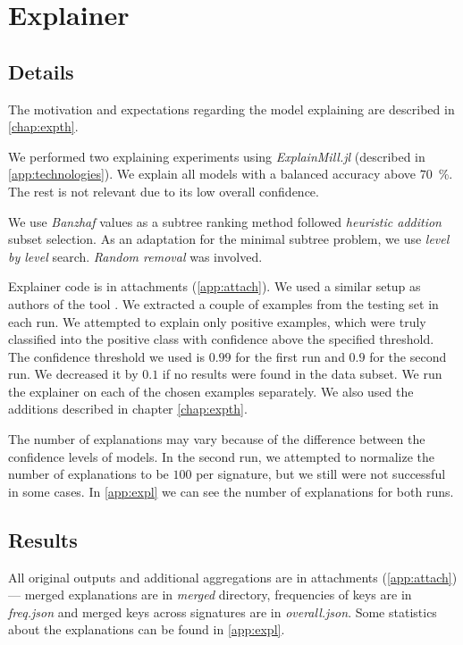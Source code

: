 \section{Explainer}
\subsection{Details}
The motivation and expectations regarding the model explaining are described in \ref{chap:expth}.

We performed two explaining experiments using \emph{ExplainMill.jl} (described in \ref{app:technologies}). We explain all models with a balanced accuracy above $70$~\%.  The rest is not relevant due to its low overall confidence.

We use \emph{Banzhaf} values as a subtree ranking method followed \emph{heuristic addition} subset selection. As an adaptation for the minimal subtree problem, we use \emph{level by level} search. \emph{Random removal} was involved.

Explainer code is in attachments (\ref{app:attach}). We used a similar setup as authors of the tool \cite{Pevny2020}. We extracted a couple of examples from the testing set in each run. We attempted to explain only positive examples, which were truly classified into the positive class with confidence above the specified threshold. The confidence threshold we used is $0.99$ for the first run and $0.9$ for the second run. We decreased it by $0.1$ if no results were found in the data subset. We run the explainer on each of the chosen examples separately. We also used the additions described in chapter \ref{chap:expth}.

The number of explanations may vary because of the difference between the confidence levels of models. In the second run, we attempted to normalize the number of explanations to be $100$ per signature, but we still were not successful in some cases.  In \ref{app:expl} we can see the number of explanations for both runs.

\subsection{Results}
All original outputs and additional aggregations are in attachments (\ref{app:attach}) --- merged explanations are in \emph{merged} directory, frequencies of keys are in \emph{freq.json} and merged keys across signatures are in \emph{overall.json}. Some statistics about the explanations can be found in \ref{app:expl}.

